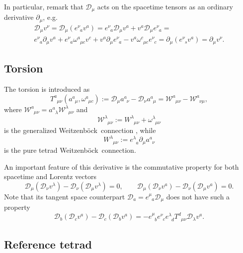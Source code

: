 \documentclass[
10pt, %
a4paper, %
oneside, %
headinclude,footinclude, %
BCOR5mm, %
]{scrartcl}
\newcommand{\pd}{\partial}
\newcommand{\itetr}[2]{e^{#1}_{\phantom{#1}#2}}
\newcommand{\tetr}[2]{a^{#1}_{\phantom{#1}#2}}
\newcommand{\spin}[2]{\omega^{#1}_{\phantom{#1}#2}}
\newcommand{\D}[1]{\mathcal{D}_{#1}} %
\newcommand{\Tors}[2]{T^{#1}_{\phantom{a}#2}}
\newcommand{\W}[2]{\mathcal{W}^{#1}_{\phantom{#1}#2}}
\newcommand{\w}[2]{W^{#1}_{\phantom{#1}#2}}
\newcommand{\We}{Weitzenb\"ock}
\begin{document}
In particular, remark that $ \D{\mu} $ acts on the spacetime tensors as an
ordinary derivative $ 
\pd_\mu $, e.g.
\begin{multline}\label{eqn.covD.pd}
\D{\mu}v^{\nu} = \D{\mu}(\itetr{\nu}{a}v^a) = \itetr{\nu}{a}\D{\mu}v^a + v^a\D{\mu}\itetr{\nu}{a} = 
\\
\itetr{\nu}{a}\pd_{\mu}v^a + \itetr{\nu}{a}\spin{a}{\mu c}v^c + 
v^a\pd_{\mu}\itetr{\nu}{a} - v^a\spin{c}{\mu c}\itetr{\nu}{c} = \pd_\mu(\itetr{\nu}{s}v^a) = 
\pd_\mu v^\nu.
\end{multline}



\subsection{Torsion}

The torsion is introduced as
\begin{equation}
\Tors{a}{\mu\nu}(\tetr{a}{\mu},\spin{a}{\mu c}):=\D{\mu}\tetr{a}{\nu} - \D{\nu}\tetr{a}{\mu} = 
\W{a}{\mu\nu} - \W{a}{\nu\mu},
\end{equation}
where $ \W{a}{\mu\nu} = \tetr{a}{\lambda}\W{\lambda}{\mu\nu}$ and 
\begin{equation}
    \W{\lambda}{\mu\nu} := \w{\lambda}{\mu\nu} + \spin{\lambda}{\mu\nu}
\end{equation}
is the 
generalized \We\ connection \cite{AldrovandiPereiraBook}, while 
\begin{equation}
    \w{\lambda}{\mu\nu} := 
    \itetr{\lambda}{a}\pd_\mu \tetr{a}{\nu}
\end{equation}
is the pure tetrad \We\ connection.


An important feature of this derivative is the commutative property for both 
spacetime and Lorentz vectors
\begin{equation}\label{eqn.commut.D}
\D{\mu}(\D{\nu} v^\lambda) - \D{\nu}(\D{\mu} v^\lambda) = 0, 
\qquad 
\D{\mu}(\D{\nu} v^a) - \D{\nu}(\D{\mu} v^a) = 0.
\end{equation}
Note that its tangent space counterpart $\D{a} = \itetr{\mu}{a}\D{\mu}$ does not have such a property
\begin{equation}
\D{b}(\D{c} v^a) - \D{c}(\D{b} v^a) = 
-\itetr{\mu}{b}\itetr{\nu}{c}\itetr{\lambda}{d}\Tors{d}{\mu\nu}\D{\lambda}v^a .
\end{equation}

\subsection{Reference tetrad}
\end{document}
